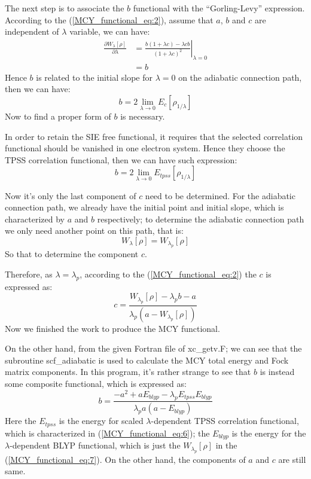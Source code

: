 The next step is to associate the $b$ functional with the ``Gorling-Levy''
expression. According to the (\ref{MCY_functional_eq:2}), assume that $a$, $b$
and $c$ are independent of $\lambda$ variable, we can have:
\begin{align}
\frac{\partial W_{\lambda}[\rho]}{\partial \lambda} 
&= \left. \frac{b(1+\lambda c) - \lambda cb}{(1+\lambda c)^{2}}\right |_{\lambda
= 0} \nonumber \\
&= b
\label{MCY_functional_eq:4} 
\end{align}
Hence $b$ is related to the initial slope for $\lambda = 0$ on the adiabatic
connection path, then we can have:
\begin{equation}
b = 2\lim_{\lambda \rightarrow 0}E_{c}[\rho_{1/\lambda}]
\label{MCY_functional_eq:5}  
\end{equation}
Now to find a proper form of $b$ is necessary.

In order to retain the SIE free functional, it requires that the selected
correlation functional should be vanished in one electron system.  Hence they
choose the TPSS correlation functional, then we can have such expression:
\begin{equation}
b =2 \lim_{\lambda \rightarrow 0}E_{tpss}[\rho_{1/\lambda}]
\label{MCY_functional_eq:6}   
\end{equation}

Now it's only the last component of $c$ need to be determined. For the
adiabatic connection path, we already have the initial point and initial
slope, which is characterized by $a$ and $b$ respectively; to determine the
adiabatic connection path we only need another point on this path, that is:
\begin{equation}
  W_{\lambda}[\rho] =  W_{\lambda_{p}}[\rho]
\label{MCY_functional_eq:7}   
\end{equation}
So that to determine the component $c$. 

Therefore, as $\lambda = \lambda_{p}$, according to the
(\ref{MCY_functional_eq:2}) the $c$ is expressed as:
\begin{equation}
c =\frac{W_{\lambda_{p}}[\rho] - \lambda_{p}b - a}{
\lambda_{p}(a - W_{\lambda_{p}}[\rho])}
\label{MCY_functional_eq:8}    
\end{equation}
Now we finished the work to produce the MCY functional.

On the other hand, from the given Fortran file of xc\_getv.F; we can see that
the subroutine scf\_adiabatic is used to calculate the MCY total energy and Fock
matrix components. In this program, it's rather strange to see that $b$ is
instead some composite functional, which is expressed as:
\begin{equation}
 b = \frac{-a^{2} + aE_{blyp} - \lambda_{p}E_{tpss}E_{blyp}}{
\lambda_{p}a(a-E_{blyp})}
\end{equation}
Here the $E_{tpss}$ is the energy for scaled $\lambda$-dependent TPSS
correlation functional, which is characterized in (\ref{MCY_functional_eq:6});
the $E_{blyp}$ is the energy for the $\lambda$-dependent BLYP functional, which
is just the $W_{\lambda_{p}}[\rho]$ in the (\ref{MCY_functional_eq:7}). On the
other hand, the components of $a$ and $c$ are still same.

